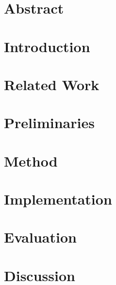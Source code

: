 \documentclass[a4paper,11pt,twoside]{pads-thesis}
\begin{document}

\gTitlePage

\chapter*{Abstract} 


\tableofcontents

\cleardoublepage
\pagestyle{fancy}

\chapter{Introduction} \label{chap:intro}


\chapter{Related Work} \label{chap:related_work}


\chapter{Preliminaries} \label{chap:prelim}


\chapter{Method} \label{chap:method}


\chapter{Implementation} \label{chap:impl}


\chapter{Evaluation} \label{chap:eval}


\chapter{Discussion} \label{chap:discussion}

\end{document}
